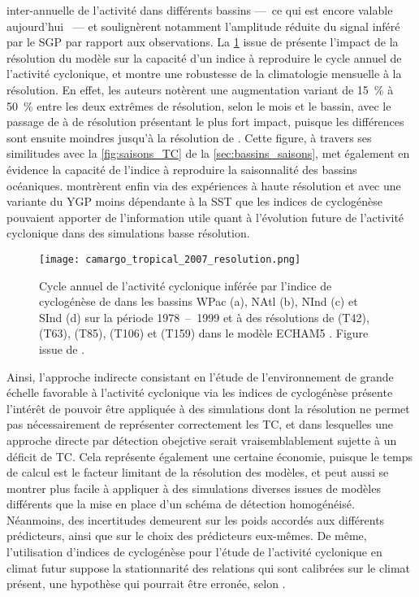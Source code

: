 \documentclass[../main.tex]{subfiles}
\begin{document}
inter-annuelle de l'activité dans différents bassins ---~ce qui est encore valable aujourd'hui \parencite{camargo_tropical_2007,camargo_tropical_2016}~--- et
soulignèrent notamment l'amplitude réduite du signal inféré par le SGP par rapport aux observations. La \cref{fig:GP_resolution} issue de
\textcite{camargo_tropical_2007} présente l'impact de la résolution du modèle sur la capacité d'un indice à reproduire le cycle annuel de l'activité cyclonique, et
montre une robustesse de la climatologie mensuelle à la résolution. En effet, les auteurs notèrent une augmentation variant de \SI{15}{\percent} à
\SI{50}{\percent} entre les deux extrêmes de résolution, selon le mois et le bassin, avec le passage de  à  de résolution présentant le plus
fort impact, puisque les différences sont ensuite moindres jusqu'à la résolution de . Cette figure, à travers ses similitudes avec la
\cref{fig:saisons_TC} de la \cref{sec:bassins_saisons}, met également en évidence la capacité de l'indice à reproduire la saisonnalité des bassins océaniques.
\textcite{mcdonald_tropical_2005,chauvin_response_2006} montrèrent enfin via des expériences à haute résolution et avec une variante du YGP moins dépendante à la
SST que les indices de cyclogénèse pouvaient apporter de l'information utile quant à l'évolution future de l'activité cyclonique dans des simulations basse
résolution.

\begin{figure}[tb]
    \centering
    \texttt{[image: camargo\_tropical\_2007\_resolution.png]}
    \caption{Cycle annuel de l'activité cyclonique inférée par l'indice de cyclogénèse de \textcite{emanuel_tropical_2004} dans les bassins WPac (a), NAtl (b), NInd
    (c) et SInd (d) sur la période \num{1978}~--~\num{1999} et à des résolutions de  (T42),  (T63),  (T85),  (T106) et 
    (T159) dans le modèle ECHAM5 \parencite{roeckner_atmospheric_2003}. Figure issue de \textcite{camargo_tropical_2007}.}
    \label{fig:GP_resolution}
\end{figure}

Ainsi, l'approche indirecte consistant en l'étude de l'environnement de grande échelle favorable à l'activité cyclonique via les indices de cyclogénèse présente
l'intérêt de pouvoir être appliquée à des simulations dont la résolution ne permet pas nécessairement de représenter correctement les TC, et dans lesquelles une
approche directe par détection obejctive serait vraisemblablement sujette à un déficit de TC. Cela représente également une certaine économie, puisque le temps
de calcul est le facteur limitant de la résolution des modèles, et peut aussi se montrer plus facile à appliquer à des simulations diverses issues de modèles
différents que la mise en place d'un schéma de détection homogénéisé. Néanmoins, des incertitudes demeurent sur les poids accordés aux différents prédicteurs,
ainsi que sur le choix des prédicteurs eux-mêmes. De même, l'utilisation d'indices de cyclogénèse pour l'étude de l'activité cyclonique en climat futur suppose
la stationnarité des relations qui sont calibrées sur le climat présent, une hypothèse qui pourrait être erronée, selon
\textcite{nolan_increased_2008,murakami_changes_2013}.
\end{document}
